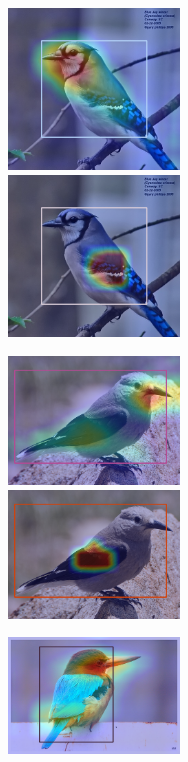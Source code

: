 \documentclass[letterpaper]{article}
\begin{document}
\begin{figure}[h]
    \centering
    \begin{subfigure}{\textwidth}
        \includegraphics[width = 0.5\textwidth, height = 0.25\textwidth]{Images/CUB-VGG-Heat/new_vgg_bbox_heat_1.png}
        \includegraphics[width = 0.5\textwidth, height = 0.25\textwidth]{Images/CUB-YOLO-Heat/new_yolo_bbox_heat_0.png}
    \end{subfigure}
    \begin{subfigure}{\textwidth}
        \includegraphics[width = 0.5\textwidth, height = 0.25\textwidth]{Images/CUB-VGG-Heat/new_vgg_bbox_heat_4.png}
        \includegraphics[width = 0.5\textwidth, height = 0.25\textwidth]{Images/CUB-YOLO-Heat/new_yolo_bbox_heat_4.png}
    \end{subfigure}
    \begin{subfigure}{\textwidth}
        \includegraphics[width = 0.5\textwidth, height = 0.25\textwidth]{Images/CUB-VGG-Heat/new_vgg_bbox_heat_8.png}

\end{subfigure}
\end{figure}
\end{document}
